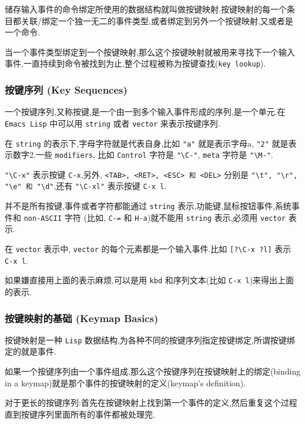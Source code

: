\documentclass[11pt]{article}
\begin{document}
储存输入事件的命令绑定所使用的数据结构就叫做按键映射.按键映射的每一个条目都关联/绑定一个独一无二的事件类型,或者绑定到另外一个按键映射,又或者是一个命令.

当一个事件类型绑定到一个按键映射,那么这个按键映射就被用来寻找下一个输入事件,一直持续到命令被找到为止,整个过程被称为按键查找(\texttt{key lookup}).

\subsubsection{按键序列 (Key Sequences)}
\label{sec:org3b50b3c}

一个按键序列,又称按键,是一个由一到多个输入事件形成的序列,是一个单元.在 \texttt{Emacs Lisp} 中可以用 \texttt{string} 或者 \texttt{vector} 来表示按键序列.

在 \texttt{string} 的表示下,字母字符就是代表自身,比如 \texttt{"a"} 就是表示字母a, \texttt{"2"} 就是表示数字2.一些 \texttt{modifiers}, 比如 \texttt{Control} 字符是 \texttt{"\textbackslash{}C-"}, \texttt{meta} 字符是 \texttt{"\textbackslash{}M-"}.

\texttt{"\textbackslash{}C-x"} 表示按键 \texttt{C-x},另外, \texttt{<TAB>, <RET>, <ESC> 和 <DEL>} 分别是 \texttt{"\textbackslash{}t", "\textbackslash{}r", "\textbackslash{}e" 和 "\textbackslash{}d"},还有 \texttt{"\textbackslash{}C-xl"} 表示按键 \texttt{C-x l}.

并不是所有按键,事件或者字符都能通过 \texttt{string} 表示,功能键,鼠标按钮事件,系统事件和 \texttt{non-ASCII} 字符 (比如, \texttt{C-=} 和 \texttt{H-a})就不能用 \texttt{string} 表示,必须用 \texttt{vector} 表示.

在 \texttt{vector} 表示中, \texttt{vector} 的每个元素都是一个输入事件.比如 \texttt{[?\textbackslash{}C-x ?l]} 表示 \texttt{C-x l}.

如果嫌直接用上面的表示麻烦,可以是用 \texttt{kbd} 和序列文本(比如 \texttt{C-x l})来得出上面的表示.


\subsubsection{按键映射的基础 (Keymap Basics)}
\label{sec:org9372bdc}

按键映射是一种 \texttt{Lisp} 数据结构,为各种不同的按键序列指定按键绑定,所谓按键绑定的就是事件.

如果一个按键序列由一个事件组成,那么这个按键序列在按键映射上的绑定(binding in a keymap)就是那个事件的按键映射的定义(keymap's definition).

对于更长的按键序列:首先在按键映射上找到第一个事件的定义,然后重复这个过程直到按键序列里面所有的事件都被处理完.
\end{document}
